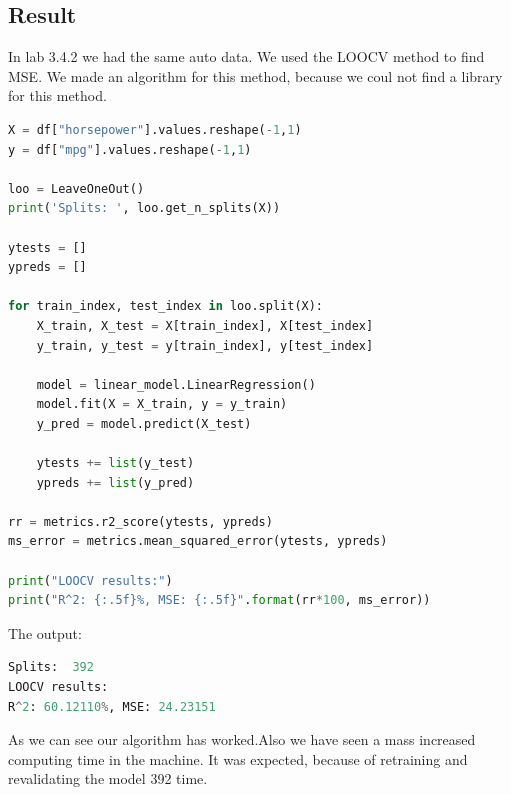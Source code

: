 \subsection{Result}
In lab 3.4.2 we had the same auto data. We used the LOOCV method to find MSE. We made an algorithm for this method, because we coul not find a library for this method.

\begin{lstlisting}[language=Python]
X = df["horsepower"].values.reshape(-1,1)
y = df["mpg"].values.reshape(-1,1) 

loo = LeaveOneOut()
print('Splits: ', loo.get_n_splits(X))

ytests = []
ypreds = []

for train_index, test_index in loo.split(X):
	X_train, X_test = X[train_index], X[test_index]
	y_train, y_test = y[train_index], y[test_index]

	model = linear_model.LinearRegression()
	model.fit(X = X_train, y = y_train)
	y_pred = model.predict(X_test)

	ytests += list(y_test)
	ypreds += list(y_pred)
	
rr = metrics.r2_score(ytests, ypreds)
ms_error = metrics.mean_squared_error(ytests, ypreds)

print("LOOCV results:")
print("R^2: {:.5f}%, MSE: {:.5f}".format(rr*100, ms_error))
\end{lstlisting}

The output:
\begin{lstlisting}[language=Python]
Splits:  392
LOOCV results:
R^2: 60.12110%, MSE: 24.23151
\end{lstlisting}

As we can see our algorithm has worked.Also we have seen a mass increased computing time in the machine. It was expected, because of retraining and revalidating the model 392 time.




